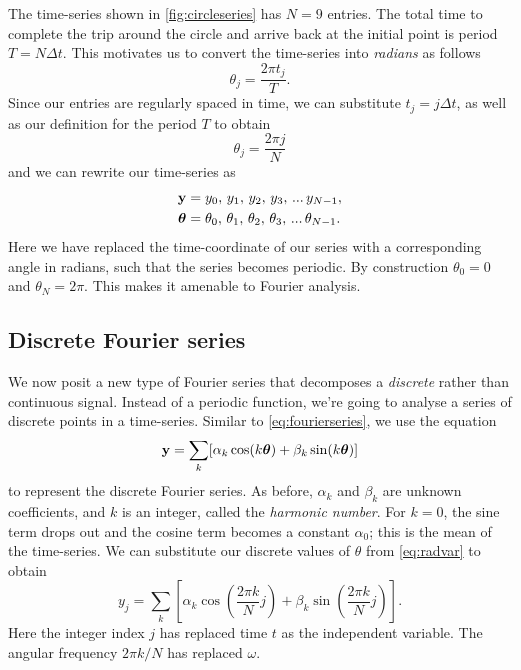 \documentclass[11pt,twoside,a4paper]{article}
\begin{document}
The time-series shown in \autoref{fig:circleseries} has $N=9$
entries. The total time to complete the trip around the circle and
arrive back at the initial point is period $T=N\Delta t$. This
motivates us to convert the time-series into \textit{radians} as
follows
\begin{displaymath}
  \theta_j = \frac{2\pi t_j}{T}.
\end{displaymath}
Since our entries are regularly spaced in time, we can substitute $t_j
= j\Delta t$, as well as our definition for the period $T$ to obtain
\begin{equation}
  \label{eq:radvar}
  \theta_j = \frac{2\pi j}{N}
\end{equation}
and we can rewrite our time-series as 
\begin{align}
  \mbox{{\bf y}} &= y_0,\,y_1,\,y_2,\,y_3,\,...\,y_{N-1},\nonumber\\
  \boldsymbol{\theta} &= \theta_0,\,\theta_1,\,\theta_2,\,
  \theta_3,\,...\,\theta_{N-1}.\nonumber
\end{align}
Here we have replaced the time-coordinate of our series with a
corresponding angle in radians, such that the series becomes periodic.
By construction $\theta_0=0$ and $\theta_N=2\pi$.  This makes it
amenable to Fourier analysis.

\subsection{Discrete Fourier series}

We now posit a new type of Fourier series that decomposes a
\textit{discrete} rather than continuous signal.  Instead of a
periodic function, we're going to analyse a series of discrete
points in a time-series.  Similar to \autoref{eq:fourierseries}, we
use the equation
\begin{equation}
  \label{eq:discretefourier_1}
  \mbox{{\bf y}} = \sum_k[\alpha_k\cos(k\boldsymbol{\theta}) + 
  \beta_k\sin(k\boldsymbol{\theta})]
\end{equation}
to represent the discrete Fourier series. As before, $\alpha_k$ and
$\beta_k$ are unknown coefficients, and $k$ is an integer, called the
\textit{harmonic number}. For $k=0$, the sine term drops out and the
cosine term becomes a constant $\alpha_0$; this is the mean of the
time-series.  We can substitute our discrete values of $\theta$ from
\autoref{eq:radvar} to obtain
\begin{equation}
  \label{eq:discretefourier_2}
  y_j = \sum_k\left[\alpha_k\cos\left(\frac{2\pi k}{N}j\right) + 
    \beta_k\sin\left(\frac{2\pi k}{N}j\right)\right].
\end{equation}
Here the integer index $j$ has replaced time $t$ as the independent
variable. The angular frequency $2\pi k/N$ has replaced $\omega$.
\end{document}

